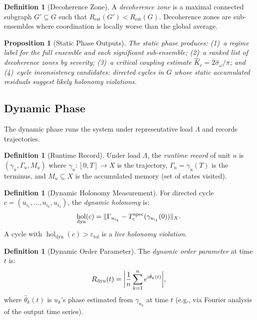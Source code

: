 \documentclass[twocolumn,a4paper,11pt]{article}
\theoremstyle{plain}
\newtheorem{proposition}[theorem]{Proposition}
\theoremstyle{definition}
\newtheorem{definition}[theorem]{Definition}
\theoremstyle{remark}
\DeclareMathOperator{\hol}{hol}
\DeclarePairedDelimiter{\abs}{\lvert}{\rvert}
\DeclarePairedDelimiter{\norm}{\lVert}{\rVert}
\begin{document}
\begin{definition}[Decoherence Zone]
\label{def:decoherence-zone}
A \emph{decoherence zone} is a maximal connected subgraph $G' \subseteq G$
such that $R_\mathrm{est}(G') < R_\mathrm{est}(G)$. Decoherence zones
are sub-ensembles where coordination is locally worse than the global
average.
\end{definition}

\begin{proposition}[Static Phase Outputs]
\label{prop:static-outputs}
The static phase produces: (1)~a regime label for the full ensemble and
each significant sub-ensemble; (2)~a ranked list of decoherence zones by
severity; (3)~a critical coupling estimate $\hat{K}_c = 2\hat\sigma_\omega
/\pi$; and (4)~cycle inconsistency candidates: directed cycles in $G$
whose static accumulated residuals suggest likely holonomy violations.
\end{proposition}

\subsection{Dynamic Phase}

The dynamic phase runs the system under representative load $\Lambda$ and
records trajectories.

\begin{definition}[Runtime Record]
\label{def:runtime-record}
Under load $\Lambda$, the \emph{runtime record} of unit $u$ is
$(\gamma_u, \Gamma_u, M_u)$ where $\gamma_u: [0,T] \to X$ is the
trajectory, $\Gamma_u = \gamma_u(T)$ is the terminus, and $M_u \subseteq X$
is the accumulated memory (set of states visited).
\end{definition}

\begin{definition}[Dynamic Holonomy Measurement]
\label{def:dynamic-holonomy}
For directed cycle $c = (u_{i_1}, \ldots, u_{i_k}, u_{i_1})$, the
\emph{dynamic holonomy} is:
\[
  \hol_\mathrm{dyn}(c) = \norm{\Gamma_{u_{i_k}} -
  T_c^{\mathrm{spec}}(\gamma_{u_{i_1}}(0))}_{X}.
\]
A cycle with $\hol_\mathrm{dyn}(c) > \varepsilon_\mathrm{tol}$ is a
\emph{live holonomy violation}.
\end{definition}

\begin{definition}[Dynamic Order Parameter]
\label{def:dynamic-order}
The \emph{dynamic order parameter} at time $t$ is:
\[
  R_\mathrm{dyn}(t) = \abs[\bigg]{\frac{1}{n} \sum_{k=1}^n
  e^{i\hat{\theta}_k(t)}},
\]
where $\hat{\theta}_k(t)$ is $u_k$'s phase estimated from $\gamma_{u_k}$
at time $t$ (e.g., via Fourier analysis of the output time series).
\end{definition}
\end{document}
